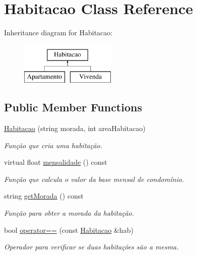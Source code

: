 \hypertarget{class_habitacao}{}\section{Habitacao Class Reference}
\label{class_habitacao}
Inheritance diagram for Habitacao\+:\begin{figure}[H]
\begin{center}
\leavevmode
\includegraphics[height=2.000000cm]{class_habitacao}
\end{center}
\end{figure}
\subsection*{Public Member Functions}
\begin{DoxyCompactItemize}
\item 
\hyperlink{class_habitacao_a3b5e5edb0ca3b52025ef46a796fcf18d}{Habitacao} (string morada, int area\+Habitacao)
\begin{DoxyCompactList}\small\item\em Função que cria uma habitação. \end{DoxyCompactList}\item 
virtual float \hyperlink{class_habitacao_a479d2307661c87b05242b86ba849fb6e}{mensalidade} () const 
\begin{DoxyCompactList}\small\item\em Função que calcula o valor da base mensal de condomínio. \end{DoxyCompactList}\item 
string \hyperlink{class_habitacao_a17ef78eef7746f92bd2814893bfafbab}{get\+Morada} () const 
\begin{DoxyCompactList}\small\item\em Função para obter a morada da habitação. \end{DoxyCompactList}\item 
bool \hyperlink{class_habitacao_acd290b8d83f41d4667867d5dc353166e}{operator==} (const \hyperlink{class_habitacao}{Habitacao} \&hab)
\begin{DoxyCompactList}\small\item\em Operador para verificar se duas habitações são a mesma. \end{DoxyCompactList}\end{DoxyCompactItemize}


